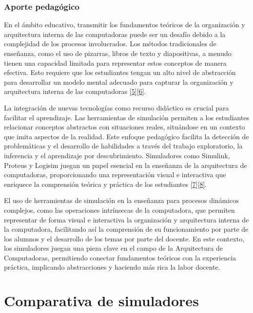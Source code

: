 \documentclass[12pt,twoside]{templates/unerthesis}
\begin{document}
\hypertarget{aporte-pedaguxf3gico}{%
\subsection{Aporte pedagógico}\label{aporte-pedaguxf3gico}}

En el ámbito educativo, transmitir los fundamentos teóricos de la organización y arquitectura interna de las computadoras puede ser un desafío debido a la complejidad de los procesos involucrados. Los métodos tradicionales de enseñanza, como el uso de pizarras, libros de texto y diapositivas, a menudo tienen una capacidad limitada para representar estos conceptos de manera efectiva. Esto requiere que los estudiantes tengan un alto nivel de abstracción para desarrollar un modelo mental adecuado para capturar la organización y arquitectura interna de las computadoras {[}\protect\hyperlink{ref-lion_simuladores_2005}{5}{]}{[}\protect\hyperlink{ref-contreras_uso_2010}{6}{]}.

La integración de nuevas tecnologías como recurso didáctico es crucial para facilitar el aprendizaje. Las herramientas de simulación permiten a los estudiantes relacionar conceptos abstractos con situaciones reales, situándose en un contexto que imita aspectos de la realidad. Este enfoque pedagógico facilita la detección de problemáticas y el desarrollo de habilidades a través del trabajo exploratorio, la inferencia y el aprendizaje por descubrimiento. Simuladores como Simulink, Proteus y Logisim juegan un papel esencial en la enseñanza de la arquitectura de computadoras, proporcionando una representación visual e interactiva que enriquece la comprensión teórica y práctica de los estudiantes {[}\protect\hyperlink{ref-garcia-garcia_pbbcache_2020}{7}{]}{[}\protect\hyperlink{ref-nova_tool_2013}{8}{]}.

El uso de herramientas de simulación en la enseñanza para procesos dinámicos complejos, como las operaciones intrínsecas de la computadora, que permiten representar de forma visual e interactiva la organización y arquitectura interna de la computadora, facilitando así la comprensión de su funcionamiento por parte de los alumnos y el desarrollo de los temas por parte del docente. En este contexto, los simuladores juegan una pieza clave en el campo de la Arquitectura de Computadoras, permitiendo conectar fundamentos teóricos con la experiencia práctica, implicando abstracciones y haciendo más rica la labor docente.

\hypertarget{comparativa-de-simuladores}{%
\chapter{Comparativa de simuladores}\label{comparativa-de-simuladores}}
\end{document}
